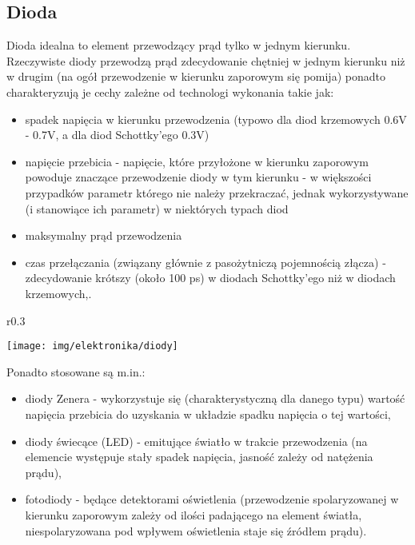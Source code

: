 \documentclass{pdfBooklets}
\begin{document}

\subsection{Dioda}
Dioda idealna to element przewodzący prąd tylko w jednym kierunku. Rzeczywiste diody przewodzą prąd zdecydowanie chętniej w jednym kierunku niż w drugim (na ogół przewodzenie w kierunku zaporowym się pomija) ponadto charakteryzują je cechy zależne od technologi wykonania takie jak:
\begin{itemize}
\item spadek napięcia w kierunku przewodzenia (typowo dla diod krzemowych 0.6V - 0.7V, a dla diod Schottky’ego 0.3V)
\item napięcie przebicia - napięcie, które przyłożone w kierunku zaporowym powoduje znaczące przewodzenie diody w tym kierunku - w większości przypadków parametr którego nie należy przekraczać, jednak wykorzystywane (i stanowiące ich parametr) w niektórych typach diod
\item maksymalny prąd przewodzenia
\item czas przełączania (związany głównie z pasożytniczą pojemnością złącza) - zdecydowanie krótszy (około 100 ps) w diodach Schottky’ego niż w diodach krzemowych,.
\end{itemize}

\begin{wrapfigure}{r}{0.3\textwidth}
  \begin{center}
    \texttt{[image: img/elektronika/diody]}
  \end{center}
\end{wrapfigure}
Ponadto stosowane są m.in.:
\begin{itemize}
\item diody Zenera - wykorzystuje się (charakterystyczną dla danego typu) wartość napięcia przebicia do uzyskania w układzie spadku napięcia o tej wartości,
\item diody świecące (LED) - emitujące światło w trakcie przewodzenia (na elemencie występuje stały spadek napięcia, jasność zależy od natężenia prądu),
\item fotodiody - będące detektorami oświetlenia (przewodzenie spolaryzowanej w kierunku zaporowym zależy od ilości padającego na element światła, niespolaryzowana pod wpływem oświetlenia staje się źródłem prądu).
\end{itemize}
\end{document}
